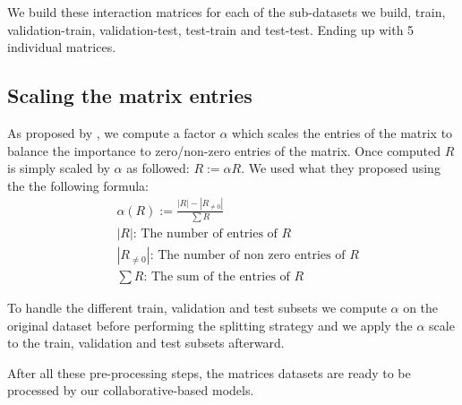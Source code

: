 We build these interaction matrices for each of the sub-datasets we build, train, validation-train, validation-test, test-train and test-test. Ending up with 5 individual matrices.

\subsection{Scaling the matrix entries}
As proposed by \cite{johnson_logistic_matrix_factorization}, we compute a factor $\alpha$ which scales the entries of the matrix to balance the importance to zero/non-zero entries of the matrix. Once computed $R$ is simply scaled by $\alpha$ as followed: $R := \alpha R$. We used what they proposed using the the following formula:
\begin{align*}
& \alpha(R) := \frac{|R| - |R_{\ne0}|}{\sum{R}}\\
& |R|\text{: The number of entries of }R\\
& |R_{\ne0}|\text{: The number of non zero entries of }R\\
& \sum{R}\text{: The sum of the entries of }R
\end{align*}

To handle the different train, validation and test subsets we compute $\alpha$ on the original dataset before performing the splitting strategy and we apply the $\alpha$ scale to the train, validation and test subsets afterward.

After all these pre-processing steps, the matrices datasets are ready to be processed by our collaborative-based models.
